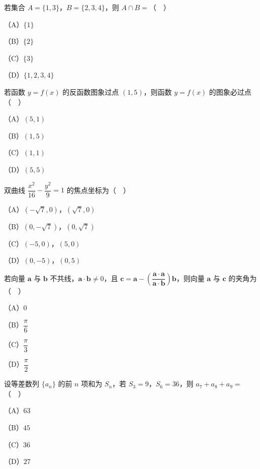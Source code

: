 


\begin{question}
若集合 $A=\{1,3\}$，$B=\{2,3,4\}$，则 $A\cap B=$（　）

（A）$\{1\}$

（B）$\{2\}$

（C）$\{3\}$

（D）$\{1,2,3,4\}$

\end{question}
\begin{question}
若函数 $y=f(x)$ 的反函数图象过点 $(1,5)$，则函数 $y=f(x)$ 的图象必过点（　）

（A）$(5,1)$

（B）$(1,5)$

（C）$(1,1)$

（D）$(5,5)$

\end{question}
\begin{question}
双曲线 $\dfrac{x^2}{16}-\dfrac{y^2}{9}=1$ 的焦点坐标为（　）

（A）$(-\sqrt7,0)$，$(\sqrt7,0)$

（B）$(0,-\sqrt7)$，$(0,\sqrt7)$

（C）$(-5,0)$，$(5,0)$

（D）$(0,-5)$，$(0,5)$

\end{question}
\begin{question}
若向量 $\boldsymbol a$ 与 $\boldsymbol b$ 不共线，$\boldsymbol a\cdot\boldsymbol b\neq0$，且 $\boldsymbol c=\boldsymbol a-\left(\dfrac{\boldsymbol a\cdot\boldsymbol a}{\boldsymbol a\cdot\boldsymbol b}\right)\boldsymbol b$，则向量 $\boldsymbol a$ 与 $\boldsymbol c$ 的夹角为（　）

（A）$0$

（B）$\dfrac{\pi}{6}$

（C）$\dfrac{\pi}{3}$

（D）$\dfrac{\pi}{2}$

\end{question}
\begin{question}
设等差数列 $\{a_n\}$ 的前 $n$ 项和为 $S_n$，若 $S_3=9$，$S_6=36$，则 $a_7+a_8+a_9=$（　）

（A）$63$

（B）$45$

（C）$36$

（D）$27$

\end{question}
